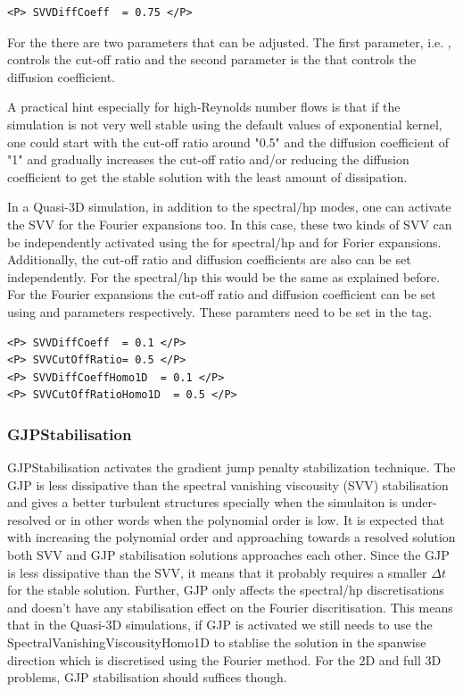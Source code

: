 \begin{lstlisting}[style=XMLStyle]
<P> SVVDiffCoeff  = 0.75 </P>
\end{lstlisting}

For the  there are two parameters that can be adjusted. 
The first parameter, i.e. ,  controls the cut-off ratio and
the second parameter is the  that controls the diffusion coefficient.

A practical hint especially for high-Reynolds number flows is that if the 
simulation is not very well stable using the default values of exponential kernel,
one could start with the cut-off ratio around "0.5" and the diffusion coefficient
of "1" and gradually increases the cut-off ratio and/or reducing the diffusion
coefficient to get the stable solution with the least amount of dissipation.

In a Quasi-3D simulation, in addition to the spectral/hp modes,  one can activate
the SVV for the Fourier expansions too. In this case, these two kinds of SVV can
be independently activated using the  
for spectral/hp and  for Forier expansions.
Additionally, the cut-off ratio and diffusion coefficients are also can be set
independently. For the spectral/hp this would be the same as explained before. 
For the Fourier expansions the cut-off ratio and diffusion coefficient can be 
set using  and  parameters
respectively. These paramters need to be set in the  tag.\\

\begin{lstlisting}[style=XMLStyle]
<P> SVVDiffCoeff  = 0.1 </P>
<P> SVVCutOffRatio= 0.5 </P>
<P> SVVDiffCoeffHomo1D  = 0.1 </P>
<P> SVVCutOffRatioHomo1D  = 0.5 </P>
\end{lstlisting}

\subsubsection{GJPStabilisation}
GJPStabilisation activates the gradient jump penalty\cite{moura2022gradient} 
stabilization technique. The GJP is less dissipative than the spectral 
vanishing viscousity (SVV) stabilisation and gives a better turbulent structures
specially when the simulaiton is under-resolved or in other words when the 
polynomial order is low. It is expected that with increasing the polynomial 
order and approaching towards a resolved solution both SVV and GJP stabilisation
solutions approaches each other. Since the GJP is less dissipative than the SVV,
it means that it probably requires a smaller $\Delta t$ for the stable solution.
Further, GJP only affects the spectral/hp discretisations and doesn't have any
stabilisation effect on the Fourier discritisation. This means that in the 
Quasi-3D simulations, if GJP is activated we still needs to use the 
SpectralVanishingViscousityHomo1D to stablise the solution in the spanwise 
direction which is discretised using the Fourier method. For the 2D and full 3D
problems, GJP stabilisation should suffices though. 

